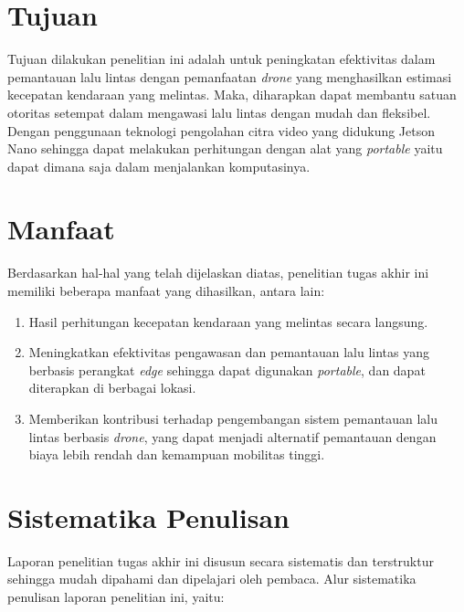\section{Tujuan}
Tujuan dilakukan penelitian ini adalah untuk peningkatan efektivitas dalam pemantauan lalu lintas dengan pemanfaatan \emph{drone} yang menghasilkan estimasi kecepatan kendaraan yang melintas. Maka, diharapkan dapat membantu satuan otoritas setempat dalam mengawasi lalu lintas dengan mudah dan fleksibel. Dengan penggunaan teknologi pengolahan citra video yang didukung Jetson Nano sehingga dapat melakukan perhitungan dengan alat yang \emph{portable} yaitu dapat dimana saja dalam menjalankan komputasinya.
 
\section{Manfaat}
Berdasarkan hal-hal yang telah dijelaskan diatas, penelitian tugas akhir ini memiliki beberapa manfaat yang dihasilkan, antara lain:
\begin{enumerate}
    \item Hasil perhitungan kecepatan kendaraan yang melintas secara langsung.
    \item Meningkatkan efektivitas pengawasan dan pemantauan lalu lintas yang berbasis perangkat \emph{edge} sehingga dapat digunakan \emph{portable}, dan dapat diterapkan di berbagai lokasi.
    \item Memberikan kontribusi terhadap pengembangan sistem pemantauan lalu lintas berbasis \emph{drone}, yang dapat menjadi alternatif pemantauan dengan biaya lebih rendah dan kemampuan mobilitas tinggi.
\end{enumerate}

\section{Sistematika Penulisan}
Laporan penelitian tugas akhir ini disusun secara sistematis dan terstruktur sehingga mudah dipahami dan dipelajari oleh pembaca. Alur sistematika penulisan laporan penelitian ini, yaitu:

